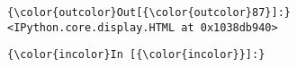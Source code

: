 \documentclass{article}
\begin{document}
            \begin{Verbatim}[commandchars=\\\{\}]
{\color{outcolor}Out[{\color{outcolor}87}]:} <IPython.core.display.HTML at 0x1038db940>
\end{Verbatim}
        
    \begin{Verbatim}[commandchars=\\\{\}]
{\color{incolor}In [{\color{incolor}}]:} 
\end{Verbatim}


    
    
    
    
\end{document}
